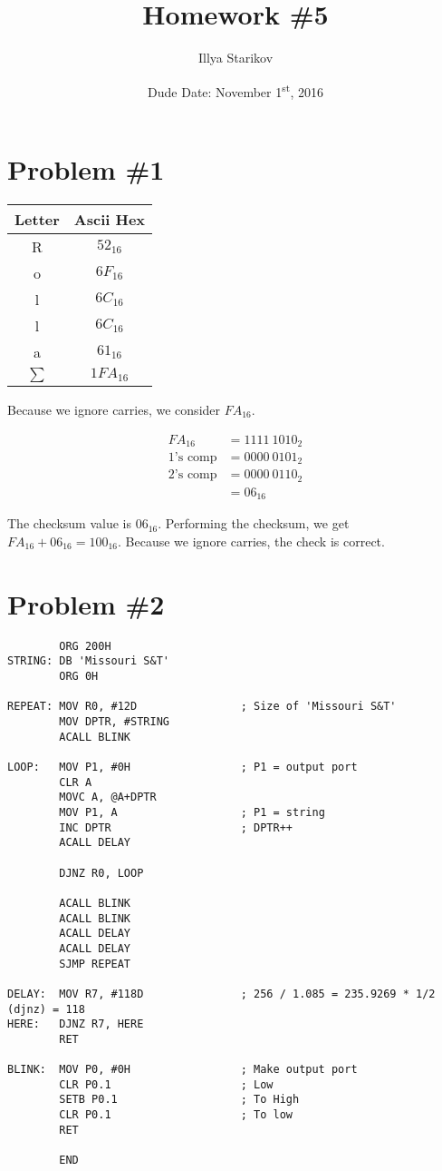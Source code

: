 \documentclass[12pt]{article}
\title{Homework \#5}
\date{Dude Date: November 1\textsuperscript{st}, 2016}
\author{Illya Starikov}
\begin{document}
\maketitle

\section{Problem \#1}
\begin{center}
    \begin{tabular}{|c|c|}
        \hline
        \textbf{Letter} & \textbf{Ascii Hex} \\ \hline
        R  & $52_{16}$ \\ \hline
        o  & $6F_{16}$ \\ \hline
        l  & $6C_{16}$ \\ \hline
        l  & $6C_{16}$ \\ \hline
        a  & $61_{16}$ \\ \hline
        $\sum$      & $1FA_{16}$ \\ \hline
    \end{tabular}
\end{center}
Because we ignore carries, we consider $FA_{16}$.

\begin{align*}
    FA_{16} &= 1111 \ 1010_{2} \\
    \text{1's comp} &= 0000 \ 0101_{2} \\
    \text{2's comp} &= 0000 \ 0110_{2} \\
    &= 06_{16}
\end{align*}

The checksum value is $06_{16}$. Performing the checksum, we get $FA_{16} + 06_{16} = 100_{16}$. Because we ignore carries, the check is correct.

\section{Problem \#2}
\begin{verbatim}
        ORG 200H
STRING: DB 'Missouri S&T'
        ORG 0H

REPEAT: MOV R0, #12D                ; Size of 'Missouri S&T'
        MOV DPTR, #STRING
        ACALL BLINK

LOOP:   MOV P1, #0H                 ; P1 = output port
        CLR A
        MOVC A, @A+DPTR
        MOV P1, A                   ; P1 = string
        INC DPTR                    ; DPTR++
        ACALL DELAY

        DJNZ R0, LOOP

        ACALL BLINK
        ACALL BLINK
        ACALL DELAY
        ACALL DELAY
        SJMP REPEAT

DELAY:  MOV R7, #118D               ; 256 / 1.085 = 235.9269 * 1/2 (djnz) = 118
HERE:   DJNZ R7, HERE
        RET

BLINK:  MOV P0, #0H                 ; Make output port
        CLR P0.1                    ; Low
        SETB P0.1                   ; To High
        CLR P0.1                    ; To low
        RET

        END
\end{verbatim}
\end{document}

